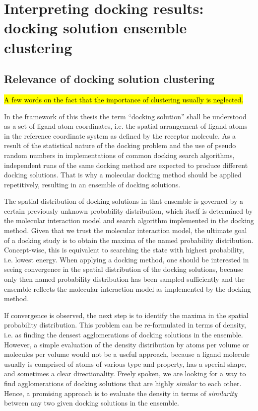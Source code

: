 \chapter{Interpreting docking results: docking solution ensemble clustering}
\section{Relevance of docking solution clustering}

\hl{A few words on the fact that the importance of clustering usually is
neglected.}

In the framework of this thesis the term \enquote{docking solution} shall be
understood as a set of ligand atom coordinates, i.e. the spatial arrangement of
ligand atoms in the reference coordinate system as defined by the receptor
molecule. As a result of the statistical nature of the docking problem and the
use of pseudo random numbers in implementations of common docking search
algorithms, independent runs of the same docking method are expected to produce
different docking solutions. That is why a molecular docking method should be
applied repetitively, resulting in an ensemble of docking solutions.

The spatial distribution of docking solutions in that ensemble is governed by a
certain previously unknown probability distribution, which itself is determined
by the molecular interaction model and search algorithm implemented in the
docking method. Given that we trust the molecular interaction model, the
ultimate goal of a docking study is to obtain the maxima of the named
probability distribution. Concept-wise, this is equivalent to searching the
state with highest probability, i.e. lowest energy. When applying a docking
method, one should be interested in seeing convergence in the spatial
distribution of the docking solutions, because only then named probability
distribution has been sampled sufficiently and the ensemble reflects the
molecular interaction model as implemented by the docking method.

If convergence is observed, the next step is to identify the maxima in the
spatial probability distribution. This problem can be re-formulated in terms of
density, i.e. as finding the densest agglomerations of docking solutions in the
ensemble. However, a simple evaluation of the density distribution by atoms per
volume or molecules per volume would not be a useful approach, because a ligand
molecule usually is comprised of atoms of various type and property, has a
special shape, and sometimes a clear directionality. Freely spoken, we are
looking for a way to find agglomerations of docking solutions that are highly
\textit{similar} to each other. Hence, a promising approach is to evaluate the
density in terms of \textit{similarity} between any two given docking solutions
in the ensemble.




